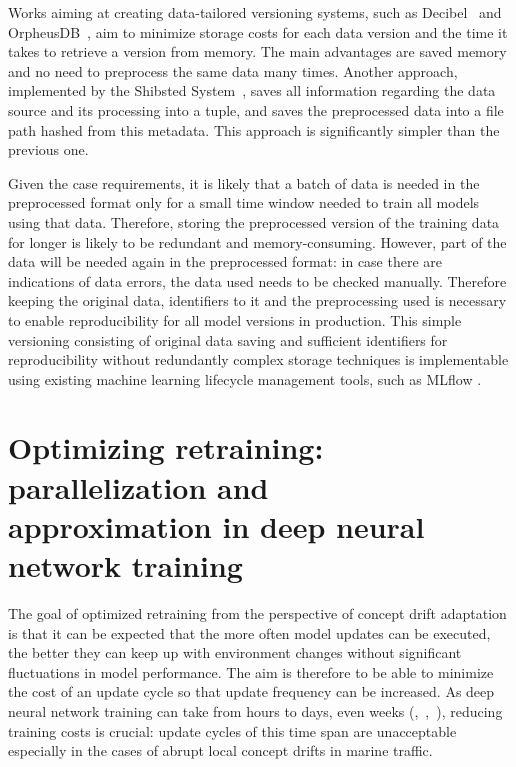 Works aiming at creating data-tailored versioning systems, such as Decibel~\cite{maddoxDecibelRelationalDataset2016} and OrpheusDB~\cite{huangEffectiveDataVersioning2019}, aim to minimize storage costs for each data version and the time it takes to retrieve a version from memory. The main advantages are saved memory and no need to preprocess the same data many times. Another approach, implemented by the Shibsted System~\cite{vanderweideVersioningEndtoEndMachine2017}, saves all information regarding the data source and its processing into a tuple, and saves the preprocessed data into a file path hashed from this metadata. This approach is significantly simpler than the previous one.

Given the case requirements, it is likely that a batch of data is needed in the preprocessed format only for a small time window needed to train all models using that data. Therefore, storing the preprocessed version of the training data for longer is likely to be redundant and memory-consuming. However, part of the data will be needed again in the preprocessed format: in case there are indications of data errors, the data used needs to be checked manually. Therefore keeping the original data, identifiers to it and the preprocessing used is necessary to enable reproducibility for all model versions in production. This simple versioning consisting of original data saving and sufficient identifiers for reproducibility without redundantly complex storage techniques is implementable using existing machine learning lifecycle management tools, such as MLflow \cite{mlflow}.

\section[Optimizing retraining: parallelization and approximation in deep neural network training]{Optimizing retraining: parallelization and \\approximation in deep neural network training}



The goal of optimized retraining from the perspective of concept drift adaptation is that it can be expected that the more often model updates can be executed, the better they can keep up with environment changes without significant fluctuations in model performance. The aim is therefore to be able to minimize the cost of an update cycle so that update frequency can be increased. As deep neural network training can take from hours to days, even weeks (\cite{szeEfficientProcessingDeep2017},~\cite{jiaHighlyScalableDeep2018},~\cite{desaHighAccuracyLowPrecisionTraining2018}), reducing training costs is crucial: update cycles of this time span are unacceptable especially in the cases of abrupt local concept drifts in marine traffic.

